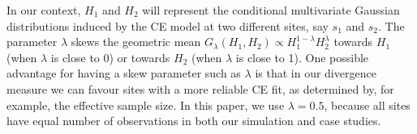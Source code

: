 \documentclass[
  12pt]{article}
\newcommand{\JSGa}{\mathop{\mathrm{JS}^{\mathrm{G}_{\lambda}}}\nolimits}
\begin{document}
In our context, $H_1$ and $H_2$ will represent the conditional multivariate Gaussian distributions induced by the CE model at two different sites, say $s_1$ and $s_2$. 
The parameter $\lambda$ skews the geometric mean $G_{\lambda}(H_1,H_2)\propto H_1^{1-\lambda}H_{2}^{\lambda}$ towards $H_1$ (when $\lambda$ is close to 0) or towards $H_2$ (when $\lambda$ is close to 1). 
One possible advantage for having a skew parameter such as $\lambda$ is that in our divergence measure we can favour sites with a more reliable CE fit, as determined by, for example, the effective sample size.
In this paper, we use $\lambda = 0.5$, because all sites have equal number of observations in both our simulation and case studies. 
\end{document}
